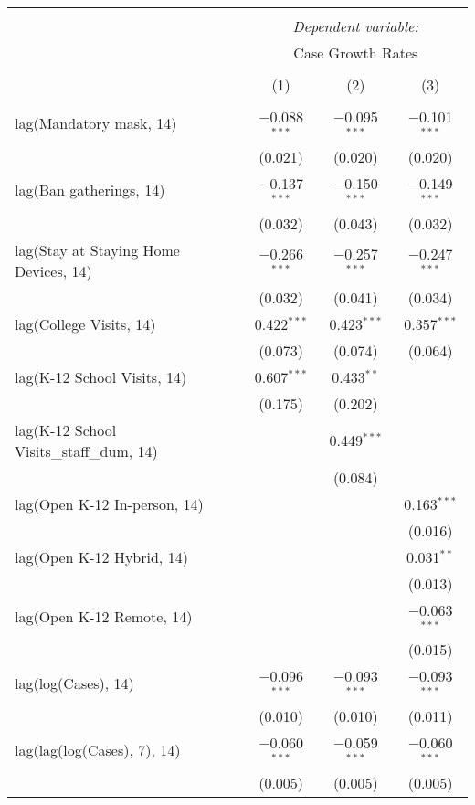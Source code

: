 \begin{tabular}{@{\extracolsep{1pt}}lccc} 
\\[-1.8ex]\hline 
\hline \\[-1.8ex] 
 & \multicolumn{3}{c}{\textit{Dependent variable:}} \\ 
\cline{2-4} 
 & \multicolumn{3}{c}{Case Growth Rates} \\ 
\\[-1.8ex] & (1) & (2) & (3)\\ 
\hline \\[-1.8ex] 
 lag(Mandatory mask, 14) & $-$0.088$^{***}$ & $-$0.095$^{***}$ & $-$0.101$^{***}$ \\ 
  & (0.021) & (0.020) & (0.020) \\ 
  lag(Ban gatherings, 14) & $-$0.137$^{***}$ & $-$0.150$^{***}$ & $-$0.149$^{***}$ \\ 
  & (0.032) & (0.043) & (0.032) \\ 
  lag(Stay at Staying Home Devices, 14) & $-$0.266$^{***}$ & $-$0.257$^{***}$ & $-$0.247$^{***}$ \\ 
  & (0.032) & (0.041) & (0.034) \\ 
  lag(College Visits, 14) & 0.422$^{***}$ & 0.423$^{***}$ & 0.357$^{***}$ \\ 
  & (0.073) & (0.074) & (0.064) \\ 
  lag(K-12 School Visits, 14) & 0.607$^{***}$ & 0.433$^{**}$ &  \\ 
  & (0.175) & (0.202) &  \\ 
  lag(K-12 School Visits\_staff\_dum, 14) &  & 0.449$^{***}$ &  \\ 
  &  & (0.084) &  \\ 
  lag(Open K-12 In-person, 14) &  &  & 0.163$^{***}$ \\ 
  &  &  & (0.016) \\ 
  lag(Open K-12 Hybrid, 14) &  &  & 0.031$^{**}$ \\ 
  &  &  & (0.013) \\ 
  lag(Open K-12 Remote, 14) &  &  & $-$0.063$^{***}$ \\ 
  &  &  & (0.015) \\ 
  lag(log(Cases), 14) & $-$0.096$^{***}$ & $-$0.093$^{***}$ & $-$0.093$^{***}$ \\ 
  & (0.010) & (0.010) & (0.011) \\ 
  lag(lag(log(Cases), 7), 14) & $-$0.060$^{***}$ & $-$0.059$^{***}$ & $-$0.060$^{***}$ \\ 
  & (0.005) & (0.005) & (0.005) \\ 

\end{tabular}
